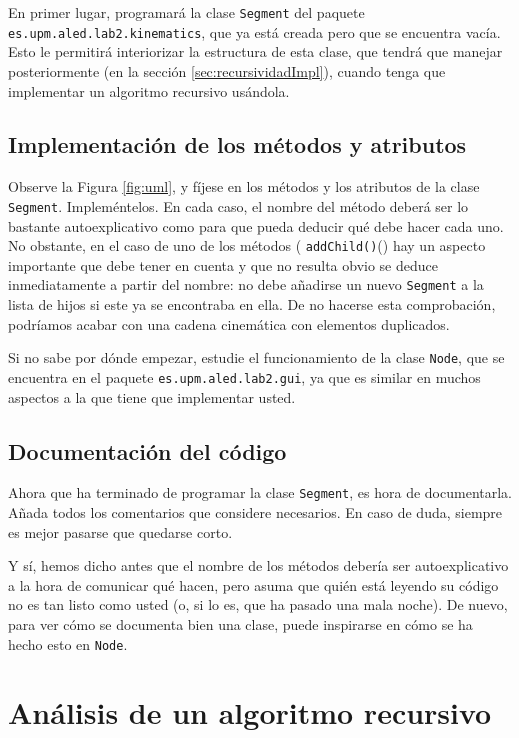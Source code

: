 \documentclass[10pt,a4paper,spanish]{article}
\newcommand{\code}[1]{\texttt{#1}}
\begin{document}
En primer lugar, programará la clase \code{Segment} del paquete \code{es.upm.aled.lab2.kinematics}, que ya está creada pero que se encuentra vacía. Esto le permitirá interiorizar la estructura de esta clase, que tendrá que manejar posteriormente (en la sección \ref{sec:recursividadImpl}), cuando tenga que implementar un algoritmo recursivo usándola.

\subsection{Implementación de los métodos y atributos}
\label{sec:implSegment}

Observe la Figura \ref{fig:uml}, y fíjese en los métodos y los atributos de la clase \code{Segment}. Impleméntelos. En cada caso, el nombre del método deberá ser lo bastante autoexplicativo como para que pueda deducir qué debe hacer cada uno. No obstante, en el caso de uno de los métodos ( \code{addChild()}() hay un aspecto importante que debe tener en cuenta y que no resulta obvio se deduce inmediatamente a partir del nombre: no debe añadirse un nuevo \code{Segment} a la lista de hijos si este ya se encontraba en ella. De no hacerse esta comprobación, podríamos acabar con una cadena cinemática con elementos duplicados.

Si no sabe por dónde empezar, estudie el funcionamiento de la clase \code{Node}, que se encuentra en el paquete \code{es.upm.aled.lab2.gui}, ya que es similar en muchos aspectos a la que tiene que implementar usted.

\subsection{Documentación del código}

Ahora que ha terminado de programar la clase \code{Segment}, es hora de documentarla. Añada todos los comentarios que considere necesarios. En caso de duda, siempre es mejor pasarse que quedarse corto.

Y sí, hemos dicho antes que el nombre de los métodos debería ser autoexplicativo a la hora de comunicar qué hacen, pero asuma que quién está leyendo su código no es tan listo como usted (o, si lo es, que ha pasado una mala noche). De nuevo, para ver cómo se documenta bien una clase, puede inspirarse en cómo se ha hecho esto en \code{Node}.

\section{Análisis de un algoritmo recursivo}
\end{document}

